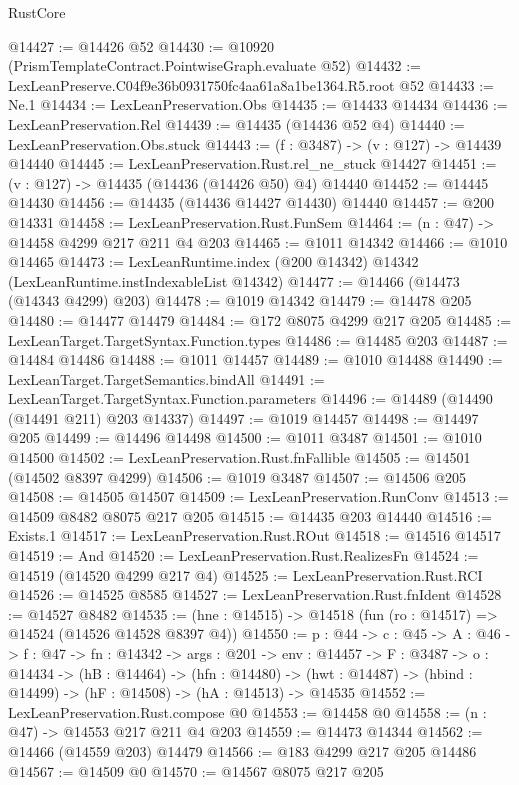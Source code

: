 \begin{lexlean}{RustCore}
\begin{coremodule}
@14427 := @14426 @52
@14430 := @10920 (PrismTemplateContract.PointwiseGraph.evaluate @52)
@14432 := LexLeanPreserve.C04f9e36b0931750fc4aa61a8a1be1364.R5.root @52
@14433 := Ne.{1}
@14434 := LexLeanPreservation.Obs
@14435 := @14433 @14434
@14436 := LexLeanPreservation.Rel
@14439 := @14435 (@14436 @52 @4)
@14440 := LexLeanPreservation.Obs.stuck
@14443 := (f : @3487) -> (v : @127) -> @14439 @14440
@14445 := LexLeanPreservation.Rust.rel_ne_stuck @14427
@14451 := (v : @127) -> @14435 (@14436 (@14426 @50) @4) @14440
@14452 := @14445 @14430
@14456 := @14435 (@14436 @14427 @14430) @14440
@14457 := @200 @14331
@14458 := LexLeanPreservation.Rust.FunSem
@14464 := (n : @47) -> @14458 @4299 @217 @211 @4 @203
@14465 := @1011 @14342
@14466 := @1010 @14465
@14473 := LexLeanRuntime.index (@200 @14342) @14342 (LexLeanRuntime.instIndexableList @14342)
@14477 := @14466 (@14473 (@14343 @4299) @203)
@14478 := @1019 @14342
@14479 := @14478 @205
@14480 := @14477 @14479
@14484 := @172 @8075 @4299 @217 @205
@14485 := LexLeanTarget.TargetSyntax.Function.types
@14486 := @14485 @203
@14487 := @14484 @14486
@14488 := @1011 @14457
@14489 := @1010 @14488
@14490 := LexLeanTarget.TargetSemantics.bindAll
@14491 := LexLeanTarget.TargetSyntax.Function.parameters
@14496 := @14489 (@14490 (@14491 @211) @203 @14337)
@14497 := @1019 @14457
@14498 := @14497 @205
@14499 := @14496 @14498
@14500 := @1011 @3487
@14501 := @1010 @14500
@14502 := LexLeanPreservation.Rust.fnFallible
@14505 := @14501 (@14502 @8397 @4299)
@14506 := @1019 @3487
@14507 := @14506 @205
@14508 := @14505 @14507
@14509 := LexLeanPreservation.RunConv
@14513 := @14509 @8482 @8075 @217 @205
@14515 := @14435 @203 @14440
@14516 := Exists.{1}
@14517 := LexLeanPreservation.Rust.ROut
@14518 := @14516 @14517
@14519 := And
@14520 := LexLeanPreservation.Rust.RealizesFn
@14524 := @14519 (@14520 @4299 @217 @4)
@14525 := LexLeanPreservation.Rust.RCI
@14526 := @14525 @8585
@14527 := LexLeanPreservation.Rust.fnIdent
@14528 := @14527 @8482
@14535 := (hne : @14515) -> @14518 (fun (ro : @14517) => @14524 (@14526 @14528 @8397 @4))
@14550 := {p : @44} ->
  {c : @45} ->
  {A : @46} ->
  {f : @47} ->
  {fn : @14342} ->
  {args : @201} ->
  {env : @14457} ->
  {F : @3487} ->
  {o : @14434} ->
  (hB : @14464) ->
  (hfn : @14480) -> (hwt : @14487) -> (hbind : @14499) -> (hF : @14508) -> (hA : @14513) -> @14535
@14552 := LexLeanPreservation.Rust.compose @0
@14553 := @14458 @0
@14558 := (n : @47) -> @14553 @217 @211 @4 @203
@14559 := @14473 @14344
@14562 := @14466 (@14559 @203) @14479
@14566 := @183 @4299 @217 @205 @14486
@14567 := @14509 @0
@14570 := @14567 @8075 @217 @205

\end{coremodule}
\end{lexlean}
